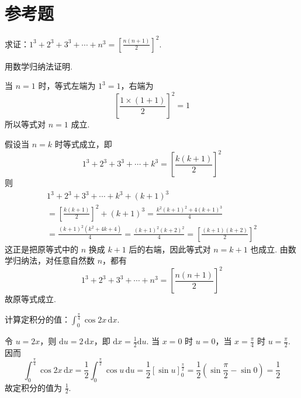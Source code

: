 \section{参考题}

\begin{problem}
求证：\(1^3+2^3+3^3+\cdots+n^3=\left[\frac{n\left(n+1\right)}{2}\right]^2\).
\end{problem}

\begin{solution}
用数学归纳法证明.

当 \(n=1\) 时，等式左端为 \(1^3=1\)，右端为
\[
\left[\frac{1\times\left(1+1\right)}{2}\right]^2=1
\]
所以等式对 \(n=1\) 成立.

假设当 \(n=k\) 时等式成立，即
\[
1^3+2^3+3^3+\cdots+k^3=\left[\frac{k\left(k+1\right)}{2}\right]^2
\]
则
\[
\begin{gathered}
1^3+2^3+3^3+\cdots+k^3+\left(k+1\right)^3\\
=\left[\frac{k\left(k+1\right)}{2}\right]^2+\left(k+1\right)^3=\frac{k^2\left(k+1\right)^2+4\left(k+1\right)^3}{4}\\
=\frac{\left(k+1\right)^2\left(k^2+4k+4\right)}{4}=\frac{\left(k+1\right)^2\left(k+2\right)^2}{4}=\left[\frac{\left(k+1\right)\left(k+2\right)}{2}\right]^2
\end{gathered}
\]
这正是把原等式中的 \(n\) 换成 \(k+1\) 后的右端，因此等式对 \(n=k+1\) 也成立. 由数学归纳法，对任意自然数 \(n\)，都有
\[
1^3+2^3+3^3+\cdots+n^3=\left[\frac{n\left(n+1\right)}{2}\right]^2
\]
故原等式成立.
\end{solution}

\begin{problem}
计算定积分的值：\(\displaystyle\int_0^{\frac{\pi}{4}}\cos2x\,\mathrm{d}x\).
\end{problem}

\begin{solution}
令 \(u=2x\)，则 \(\mathrm{d}u=2\,\mathrm{d}x\)，即 \(\mathrm{d}x=\frac{1}{2}\mathrm{d}u\). 当 \(x=0\) 时 \(u=0\)，当 \(x=\frac{\pi}{4}\) 时 \(u=\frac{\pi}{2}\). 因而
\[
\int_0^{\frac{\pi}{4}}\cos2x\,\mathrm{d}x=\frac{1}{2}\int_0^{\frac{\pi}{2}}\cos u\,\mathrm{d}u=\frac{1}{2}\left[\sin u\right]_0^{\frac{\pi}{2}}=\frac{1}{2}\left(\sin\frac{\pi}{2}-\sin0\right)=\frac{1}{2}
\]
故定积分的值为 \(\frac{1}{2}\).
\end{solution}
